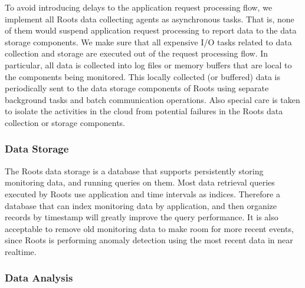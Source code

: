 
To avoid introducing delays to the application request processing flow, we implement
all Roots data collecting agents as asynchronous tasks. That is, none of them would
suspend application request processing to report data to the data storage components.
We make sure that all expensive I/O tasks related to data collection and storage are
executed out of the request processing flow.
In particular, all data is collected into log files or memory buffers that are local to the components being
monitored. This locally collected (or buffered) data is periodically sent
to the data storage components of Roots using separate background tasks and batch communication
operations. Also special care is taken to isolate the activities in the cloud from potential
failures in the Roots data collection or storage components.

\subsubsection{Data Storage}

The Roots data storage is a database that supports persistently storing monitoring data, and running
queries on them.  
Most data retrieval queries executed
by Roots use application and time intervals as indices. Therefore a database that can index monitoring
data by application, and then organize records by timestamp will greatly improve the query performance.
It is also acceptable to remove old monitoring data to make room for more recent events, since Roots
is performing anomaly detection using the most recent data in near realtime.

\subsubsection{Data Analysis}

